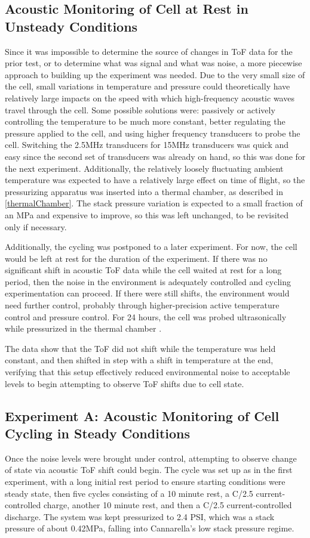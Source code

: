 \subsection{Acoustic Monitoring of Cell at Rest in Unsteady Conditions}\label{chamberTest}
Since it was impossible to determine the source of changes in ToF data for the prior test, or to determine what was signal and what was noise, a more piecewise approach to building up the experiment was needed. Due to the very small size of the cell, small variations in temperature and pressure could theoretically have relatively large impacts on the speed with which high-frequency acoustic waves travel through the cell. Some possible solutions were: passively or actively controlling the temperature to be much more constant, better regulating the pressure applied to the cell, and using higher frequency transducers to probe the cell. Switching the 2.5MHz transducers for 15MHz transducers was quick and easy since the second set of transducers was already on hand, so this was done for the next experiment. Additionally, the relatively loosely fluctuating ambient temperature was expected to have a relatively large effect on time of flight, so the pressurizing apparatus was inserted into a thermal chamber, as described in \hyperref[thermalChamber]{\cref{thermalChamber}}. The stack pressure variation is expected to a small fraction of an MPa and expensive to improve, so this was left unchanged, to be revisited only if necessary.

Additionally, the cycling was postponed to a later experiment.
For now, the cell would be left at rest for the duration of the experiment. 
If there was no significant shift in acoustic ToF data while the cell waited at rest for a long period, then the noise in the environment is adequately controlled and cycling experimentation can proceed. 
If there were still shifts, the environment would need further control, probably through higher-precision active temperature control and pressure control. 
For 24 hours, the cell was probed ultrasonically while pressurized in the thermal chamber .

The data show that the ToF did not shift while the temperature was held constant, and then shifted in step with a shift in temperature at the end, verifying that this setup effectively reduced environmental noise to acceptable levels to begin attempting to observe ToF shifts due to cell state.

\subsection{Experiment A: Acoustic Monitoring of Cell Cycling in Steady Conditions}
Once the noise levels were brought under control, attempting to observe change of state via acoustic ToF shift could begin. The cycle was set up as in the first experiment, with a long initial rest period to ensure starting conditions were steady state, then five cycles consisting of a 10 minute rest, a C/2.5 current-controlled charge, another 10 minute rest, and then a C/2.5 current-controlled discharge. 
The system was kept pressurized to 2.4 PSI, which was a stack pressure of about 0.42MPa, falling into Cannarella's low stack pressure regime.

